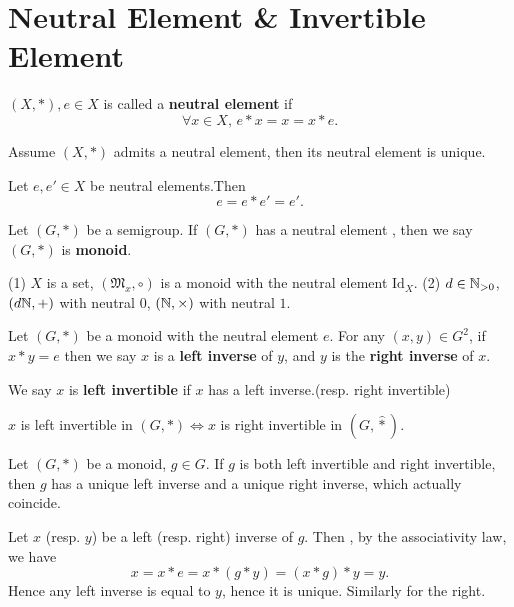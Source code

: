\documentclass{book}
\numberwithin{equation}{section}
\begin{document}
\section{Neutral Element \& Invertible Element}
\begin{definitionenv}
    $(X, *), e\in X$ is called a \textbf{neutral element} if 
    $$\forall x\in X, \,  e*x=x=x*e.$$
\end{definitionenv}
\begin{propositionenv}
    Assume $(X, *)$ admits a neutral element,  then its neutral element is unique.
\end{propositionenv}
\begin{proofenv}
    Let $e, e'\in X$ be neutral elements.Then 
    $$e=e*e'=e'.$$
\end{proofenv}
\begin{definitionenv}
    Let $(G, *)$ be a semigroup. If $(G, *)$ has a neutral element ,  then we say $(G, *)$ is \textbf{monoid}.
\end{definitionenv}
\begin{exampleenv}
    \quad
    \newline
    (1) $X$ is a set,  $(\mathfrak{M} _x, \circ)$ is a monoid with the neutral element $\mathrm{Id}_X$.
    \newline
    (2) $d\in \mathbb{N}_{>0}$, $(d\mathbb{N}, +)$ with neutral $0$, $(\mathbb{N}, \times)$ with neutral $1$.
\end{exampleenv}
\begin{definitionenv}
    Let $(G, *)$ be a monoid with the neutral element $e$. For any $ (x, y)\in G^2$,  if $x*y=e$ then we say $x$ is a \textbf{left inverse} of $y$,  and $y$ is the \textbf{right inverse} of $x$.
\end{definitionenv}
\begin{remark}
    We say $x$ is \textbf{left invertible} if $x$ has a left inverse.(resp. right invertible)
\end{remark}
\begin{remark}
    $x$ is left invertible in $(G, *)\Leftrightarrow x $ is right invertible in $(G, \hat{*})$.
\end{remark}
\begin{propositionenv}
    Let $(G, *)$ be a monoid,  $g\in G$. If $g$ is both left invertible and right invertible,  then $g$ has a unique left inverse and a unique right inverse, which actually coincide.
\end{propositionenv}
\begin{proofenv}
    Let $x$ (resp. $y$) be a left (resp. right) inverse of $g$. Then ,  by the associativity law,  we have 
    $$x=x*e=x*(g*y)=(x*g)*y=y.$$
    Hence any left inverse is equal to $y$,  hence it is unique. Similarly for the right.
\end{proofenv}
\end{document}
